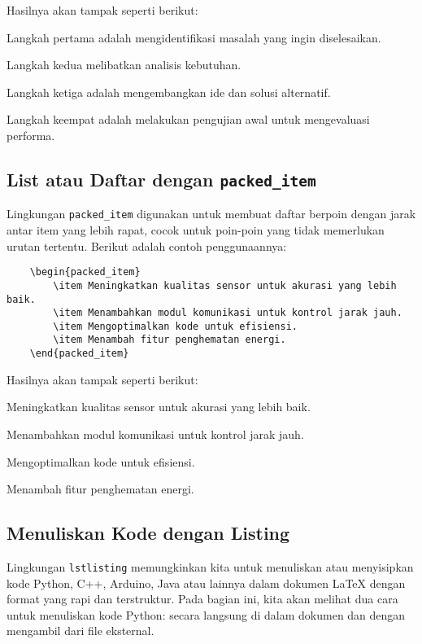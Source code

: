 Hasilnya akan tampak seperti berikut:
\begin{packed_enum}
    \item Langkah pertama adalah mengidentifikasi masalah yang ingin diselesaikan.
    \item Langkah kedua melibatkan analisis kebutuhan.
    \item Langkah ketiga adalah mengembangkan ide dan solusi alternatif.
    \item Langkah keempat adalah melakukan pengujian awal untuk mengevaluasi performa.
\end{packed_enum}

\subsection{List atau Daftar dengan \texttt{packed\_item}}
Lingkungan \texttt{packed\_item} digunakan untuk membuat daftar berpoin dengan jarak antar item yang lebih rapat, cocok untuk poin-poin yang tidak memerlukan urutan tertentu. Berikut adalah contoh penggunaannya:

\begin{lstlisting}
    \begin{packed_item}
        \item Meningkatkan kualitas sensor untuk akurasi yang lebih baik.
        \item Menambahkan modul komunikasi untuk kontrol jarak jauh.
        \item Mengoptimalkan kode untuk efisiensi.
        \item Menambah fitur penghematan energi.
    \end{packed_item}
\end{lstlisting}

Hasilnya akan tampak seperti berikut:
\begin{packed_item}
    \item Meningkatkan kualitas sensor untuk akurasi yang lebih baik.
    \item Menambahkan modul komunikasi untuk kontrol jarak jauh.
    \item Mengoptimalkan kode untuk efisiensi.
    \item Menambah fitur penghematan energi.
\end{packed_item}

\subsection{Menuliskan Kode dengan Listing}
Lingkungan \texttt{lstlisting} memungkinkan kita untuk menuliskan atau menyisipkan kode Python, C++, Arduino, Java atau lainnya dalam dokumen LaTeX dengan format yang rapi dan terstruktur. Pada bagian ini, kita akan melihat dua cara untuk menuliskan kode Python: secara langsung di dalam dokumen dan dengan mengambil dari file eksternal.

